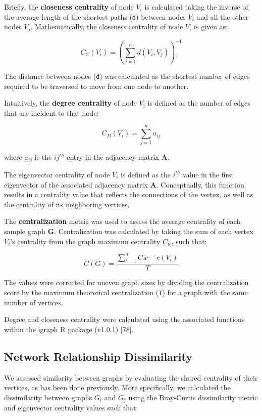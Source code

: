 \documentclass[12pt,]{article}
\begin{document}
Briefly, the \textbf{closeness centrality} of node \(V_i\) is calculated
taking the inverse of the average length of the shortest paths
(\texttt{d}) between nodes \(V_i\) and all the other nodes \(V_j\).
Mathematically, the closeness centrality of node \(V_i\) is given as:

\[ { C }_{ C }\left( { V }_{ i } \right) ={ \left( \sum _{ j=1 }^{ n }{ d\left( { V }_{ i },{ V }_{ j } \right)  }  \right)  }^{ -1 } \]

The distance between nodes (\texttt{d}) was calculated as the shortest
number of edges required to be traversed to move from one node to
another.

Intuitively, the \textbf{degree centrality} of node \(V_i\) is defined
as the number of edges that are incident to that node:

\[ { C }_{ D }\left( { V }_{ i } \right) =\sum _{ j=1 }^{ n }{ { a }_{ ij } } \]

where \(a_{ij}\) is the \(ij^{th}\) entry in the adjacency matrix
\(\mathbf{A}\).

The eigenvector centrality of node \(V_i\) is defined as the \(i^{th}\)
value in the first eigenvector of the associated adjacency matrix
\(\mathbf{A}\). Conceptually, this function results in a centrality
value that reflects the connections of the vertex, as well as the
centrality of its neighboring vertices.

The \textbf{centralization} metric was used to assess the average
centrality of each sample graph \(\mathbf{G}\). Centralization was
calculated by taking the sum of each vertex \(V_{i}\)'s centrality from
the graph maximum centrality \(C_{w}\), such that:

\[ C\left( G \right) =\frac { \sum _{ i=1 }^{ n }{ Cw -c\left( { V }_{ i } \right)  }  }{ { T } }  \]

The values were corrected for uneven graph sizes by dividing the
centralization score by the maximum theoretical centralization
(\texttt{T}) for a graph with the same number of vertices.

Degree and closeness centrality were calculated using the associated
functions within the igraph R package (v1.0.1) {[}78{]}.

\subsection{Network Relationship
Dissimilarity}\label{network-relationship-dissimilarity}

We assessed similarity between graphs by evaluating the shared
centrality of their vertices, as has been done previously. More
specifically, we calculated the dissimilarity between graphs \(G_{i}\)
and \(G_{j}\) using the Bray-Curtis dissimilarity metric and eigenvector
centrality values such that:
\end{document}
